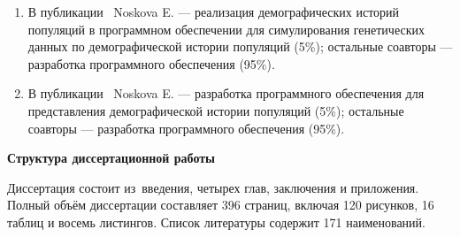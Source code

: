 \begin{enumerate}[label=\arabic*.]
    \item %
    В публикации~\cite{lauterbur2023expanding} Noskova E. --- реализация демографических историй популяций в программном обеспечении для симулирования генетических данных по демографической истории популяций (5\%); остальные соавторы --- разработка программного обеспечения (95\%).
    
    \item %
    В публикации~\cite{gower2022demes} Noskova E. --- разработка программного обеспечения для представления демографической истории популяций (5\%); остальные соавторы --- разработка программного обеспечения (95\%).\\
\end{enumerate}


\textbf{Структура диссертационной работы}

Диссертация состоит из~введения, четырех глав, заключения и приложения.
Полный объём диссертации составляет
396 страниц, включая 120 рисунков,
16 таблиц и восемь листингов.
Список литературы содержит 171 наименований.\\